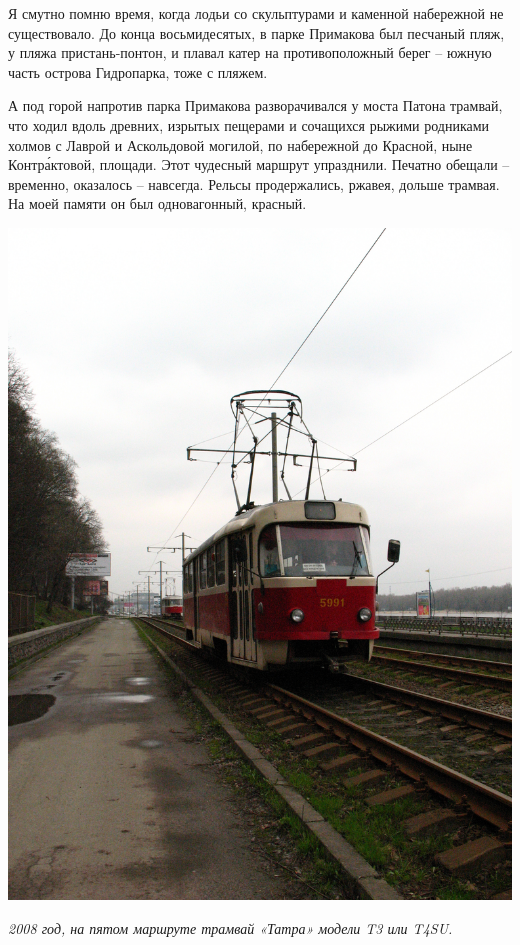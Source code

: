 


Я смутно помню время, когда лодьи со скульптурами и каменной набережной не существовало. До конца восьмидесятых, в парке Примакова был песчаный пляж, у пляжа пристань-понтон, и плавал катер на противоположный берег – южную часть острова Гидропарка, тоже с пляжем.

А под горой напротив парка Примакова разворачивался у моста Патона трамвай, что ходил вдоль древних, изрытых пещерами и сочащихся рыжими родниками холмов с Лаврой и Аскольдовой могилой, по набережной до Красной, ныне Контр\'актовой, площади. Этот чудесный маршрут упразднили. Печатно обещали – временно, оказалось – навсегда. Рельсы продержались, ржавея, дольше трамвая. На моей памяти он был одновагонный, красный.

\begin{center}
\includegraphics[width=0.70\linewidth]{chast-colebanie-osnov/nachalo/tramvay-no-5.jpg}

\textit{2008 год, на пятом маршруте трамвай «Татра» модели T3 или T4SU.} 
\end{center}


